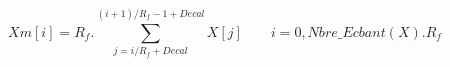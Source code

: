 $$
Xm[i] = R_f . \sum_{j = i/R_f + Decal}^{(i+1)/R_f -1 + Decal} X[j]
\qquad i=0,Nbre\_Ecbant(X). R_f
$$
